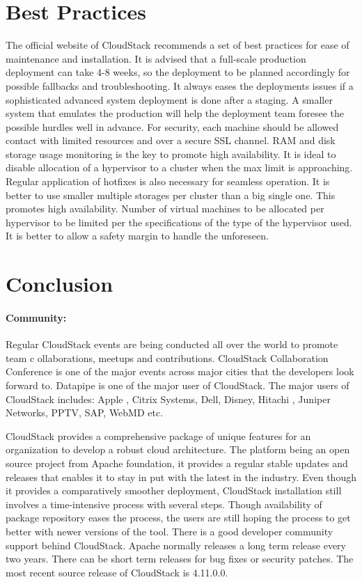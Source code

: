 \section{Best Practices}

The official website of CloudStack recommends a set of best practices for ease of 
maintenance and installation. It is advised that a full-scale production deployment 
can take 4-8 weeks, so the deployment to be planned accordingly for possible 
fallbacks and troubleshooting. It always eases the deployments issues if a sophisticated 
advanced system deployment is done after a staging. A smaller system that emulates the production 
 will help the deployment team foresee the possible hurdles well in advance. 
For security, each machine should be allowed contact 
with limited resources and over a secure SSL channel. RAM and disk storage usage monitoring 
is the key to promote high availability. It is ideal to disable allocation of a hypervisor
to a cluster when the max limit is approaching. Regular application of hotfixes is also necessary for 
seamless operation. It is better to use smaller multiple storages per cluster than a big single one.
This promotes high availability. Number of virtual machines to be allocated per hypervisor to be limited per the
specifications of the type of the hypervisor used. It is better to allow a safety margin to handle the unforeseen.
 ~\cite{hid-sp18-417-www-cloudstack-best-practices}


\section{Conclusion}

\paragraph {Community:} 
Regular CloudStack events are being conducted all over the world to promote team c
ollaborations, meetups and contributions. CloudStack Collaboration Conference is 
one of the major events across major cities that the developers look forward to. 
Datapipe is one of the major user of CloudStack. The major users of CloudStack
includes: Apple , Citrix Systems, Dell, Disney, Hitachi , Juniper Networks, PPTV, SAP, 
WebMD etc. 

CloudStack provides a comprehensive package of unique features for an 
organization to develop a robust cloud architecture. The platform being an open source project
from Apache foundation, it provides a regular stable updates and releases that enables it to 
stay in put with the latest in the industry. Even though it provides a comparatively smoother deployment,
CloudStack installation still involves a time-intensive process with several steps. Though 
availability of package repository eases the process, the users are still 
hoping the process to get better with newer versions of the tool. 
There is a good developer community support
behind CloudStack. Apache normally releases a long term release every two years.
 There can be short term releases for bug fixes or security patches.
The most recent source release of CloudStack is 4.11.0.0.

